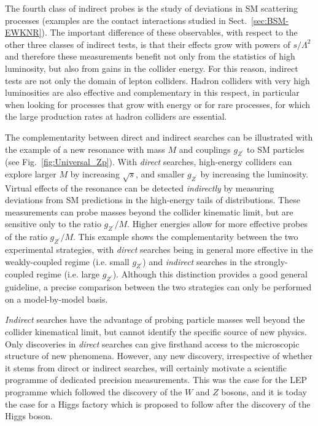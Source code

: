 \documentclass[../report.tex]{subfiles}
\begin{document}
The fourth class of indirect probes is the study of deviations in SM scattering processes (examples are the contact interactions studied in Sect.~\ref{sec:BSM-EWKNR}). The important difference of these observables, with respect to the other three classes of indirect tests, is that their effects grow with powers of $s/\Lambda^2$ and therefore these measurements benefit not only from the statistics of high luminosity, but also from gains in the collider energy. For this reason, indirect tests are not only the domain of lepton colliders. Hadron colliders with very high luminosities are also effective and complementary in this respect, in particular when looking for processes that grow with energy or for rare processes, for which the large production rates at hadron colliders are essential.

The complementarity between direct and indirect searches can be illustrated with the example of a new resonance with mass $M$ and couplings $g_{Z^\prime}$ to SM particles (see Fig.~\ref{fig:Universal_Zp}). With {\it direct} searches, high-energy colliders can explore larger $M$ by increasing $\sqrt{s}$, and smaller $g_{Z^\prime}$ by increasing the luminosity. Virtual effects of the resonance can be detected {\it indirectly} by measuring deviations from SM predictions in the high-energy tails of distributions. These measurements can probe masses beyond the collider kinematic limit, but are sensitive only to the ratio $g_{Z^\prime}/M$. Higher energies allow for more effective probes of the ratio $g_{Z^\prime}/M$. This example shows the complementarity between the two experimental strategies, with {\it direct} searches being in general more effective in the weakly-coupled regime (i.e. small $g_{Z^\prime}$) and {\it indirect} searches in the strongly-coupled regime (i.e. large $g_{Z^\prime}$). Although this distinction provides a good general guideline, a precise comparison between the two strategies can only be performed on a model-by-model basis. 

{\it Indirect} searches have the advantage of probing particle masses well beyond the collider kinematical limit, but cannot identify the specific source of new physics.
Only discoveries in {\it direct} searches can give firsthand access to the microscopic structure of new phenomena. However, any new discovery, irrespective of whether it stems from direct or indirect searches, will certainly motivate a scientific programme of dedicated precision measurements. This was the case for the LEP programme which followed the discovery of the $W$ and $Z$ bosons, and it is today the case for a Higgs factory which is proposed to follow after the discovery of the Higgs boson.
\end{document}
